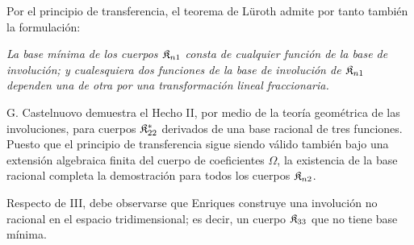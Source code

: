 \documentclass[11pt]{article}
\begin{document}
Por el principio de transferencia, el teorema de Lüroth admite por tanto también la formulación:

\emph{La base mínima de los cuerpos $\mathfrak{K}_{n1}$ consta de cualquier función de la base de involución; y cualesquiera dos funciones de la base de involución de $\mathfrak{K}_{n1}$ dependen una de otra por una transformación lineal fraccionaria.}

G. Castelnuovo demuestra el Hecho II, por medio de la teoría geométrica de las involuciones, para cuerpos $\mathfrak{K}^*_{22}$ derivados de una base racional de tres funciones. Puesto que el principio de transferencia sigue siendo válido también bajo una extensión algebraica finita del cuerpo de coeficientes $\Omega$, la existencia de la base racional completa la demostración para todos los cuerpos $\mathfrak{K}_{n2}$.

Respecto de III, debe observarse que Enriques construye una involución no racional en el espacio tridimensional; es decir, un cuerpo $\mathfrak{K}_{33}$ que no tiene base mínima.
\end{document}
